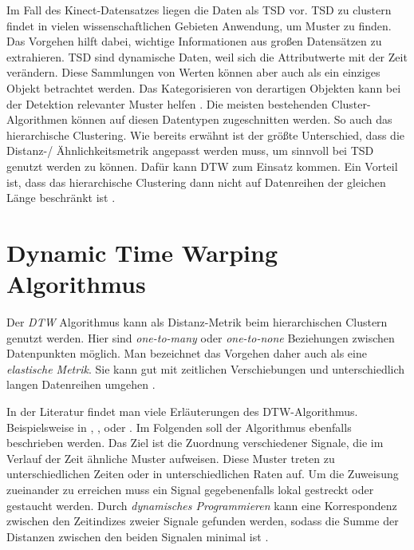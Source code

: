 Im Fall des Kinect-Datensatzes liegen die Daten als \ac{TSD} vor.
\ac{TSD} zu clustern findet in vielen wissenschaftlichen Gebieten Anwendung, um Muster zu finden.
Das Vorgehen hilft dabei, wichtige Informationen aus großen Datensätzen zu extrahieren.
\ac{TSD} sind dynamische Daten, weil sich die Attributwerte mit der Zeit verändern.
Diese Sammlungen von Werten können aber auch als ein einziges Objekt betrachtet werden.
Das Kategorisieren von derartigen Objekten kann bei der Detektion relevanter Muster helfen \citep{aghabozorgi_time-series_2015}.
Die meisten bestehenden Cluster-Algorithmen können auf diesen Datentypen zugeschnitten werden.
So auch das hierarchische Clustering.
Wie bereits erwähnt ist der größte Unterschied, dass die Distanz-/ Ähnlichkeitsmetrik angepasst werden muss,
um sinnvoll bei \ac{TSD} genutzt werden zu können.
Dafür kann \ac*{DTW} zum Einsatz kommen.
Ein Vorteil ist, dass das hierarchische Clustering dann
nicht auf Datenreihen der gleichen Länge beschränkt ist \citep{warren_liao_clustering_2005}.

\section{Dynamic Time Warping Algorithmus}
\label{3-DTW}
Der \emph{\ac{DTW}} Algorithmus kann als Distanz-Metrik beim hierarchischen Clustern genutzt werden.
Hier sind \emph{one-to-many} oder \emph{one-to-none} Beziehungen zwischen Datenpunkten möglich.
Man bezeichnet das Vorgehen daher auch als eine \emph{elastische Metrik}.
Sie kann gut mit zeitlichen Verschiebungen und unterschiedlich langen Datenreihen umgehen \citep{aghabozorgi_time-series_2015}.

In der Literatur findet man viele Erläuterungen des \ac{DTW}-Algorithmus.
Beispielsweise in \citet{mohammadzade_dynamic_2021}, \citet{warren_liao_clustering_2005},
\citet{aghabozorgi_time-series_2015} oder \citet{yu_dynamic_2019}.
Im Folgenden soll der Algorithmus ebenfalls beschrieben werden.
Das Ziel ist die Zuordnung verschiedener Signale,
die im Verlauf der Zeit ähnliche Muster aufweisen.
Diese Muster treten zu unterschiedlichen Zeiten oder in unterschiedlichen Raten auf.
Um die Zuweisung zueinander zu erreichen muss ein Signal gegebenenfalls lokal gestreckt oder gestaucht werden.
Durch \emph{dynamisches Programmieren} kann eine Korrespondenz zwischen den Zeitindizes zweier Signale gefunden werden,
sodass die Summe der Distanzen zwischen den beiden Signalen minimal ist \citep{mohammadzade_dynamic_2021}.

